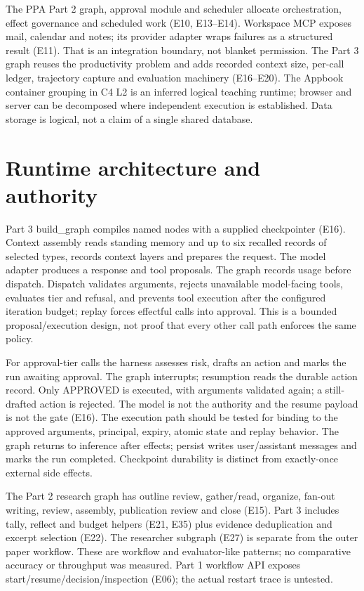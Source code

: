\documentclass[10pt,letterpaper]{article}
\begin{document}
The PPA Part 2 graph, approval module and scheduler allocate orchestration, effect governance and scheduled work (E10, E13--E14). Workspace MCP exposes mail, calendar and notes; its provider adapter wraps failures as a structured result (E11). That is an integration boundary, not blanket permission. The Part 3 graph reuses the productivity problem and adds recorded context size, per-call ledger, trajectory capture and evaluation machinery (E16--E20). The Appbook container grouping in C4 L2 is an inferred logical teaching runtime; browser and server can be decomposed where independent execution is established. Data storage is logical, not a claim of a single shared database.

\section{Runtime architecture and authority}
Part 3 build\_graph compiles named nodes with a supplied checkpointer (E16). Context assembly reads standing memory and up to six recalled records of selected types, records context layers and prepares the request. The model adapter produces a response and tool proposals. The graph records usage before dispatch. Dispatch validates arguments, rejects unavailable model-facing tools, evaluates tier and refusal, and prevents tool execution after the configured iteration budget; replay forces effectful calls into approval. This is a bounded proposal/execution design, not proof that every other call path enforces the same policy.

For approval-tier calls the harness assesses risk, drafts an action and marks the run awaiting approval. The graph interrupts; resumption reads the durable action record. Only APPROVED is executed, with arguments validated again; a still-drafted action is rejected. The model is not the authority and the resume payload is not the gate (E16). The execution path should be tested for binding to the approved arguments, principal, expiry, atomic state and replay behavior. The graph returns to inference after effects; persist writes user/assistant messages and marks the run completed. Checkpoint durability is distinct from exactly-once external side effects.

The Part 2 research graph has outline review, gather/read, organize, fan-out writing, review, assembly, publication review and close (E15). Part 3 includes tally, reflect and budget helpers (E21, E35) plus evidence deduplication and excerpt selection (E22). The researcher subgraph (E27) is separate from the outer paper workflow. These are workflow and evaluator-like patterns; no comparative accuracy or throughput was measured. Part 1 workflow API exposes start/resume/decision/inspection (E06); the actual restart trace is untested.
\end{document}
